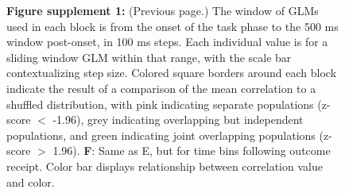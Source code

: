\documentclass[11pt]{article}
\newcommand{\bsf}[1]{\textbf{#1}}
\begin{document}
\addtocounter{figure}{-1}
\begin{figure} [t!]
  \caption*{\bsf{Figure supplement 1:} (Previous page.) {\color{red} The window of GLMs used in each block is from the onset of the task phase to the 500 ms window post-onset, in 100 ms steps. Each individual value is for a sliding window GLM within that range, with the scale bar contextualizing step size. Colored square borders around each block indicate the result of a comparison of the mean correlation to a shuffled distribution, with pink indicating separate populations (z-score $<$ -1.96), grey indicating overlapping but independent populations, and green indicating joint overlapping populations (z-score $>$ 1.96). \bsf{F}: Same as E, but for time bins following outcome receipt. Color bar displays relationship between correlation value and color.}}
\end{figure}
\end{document}
